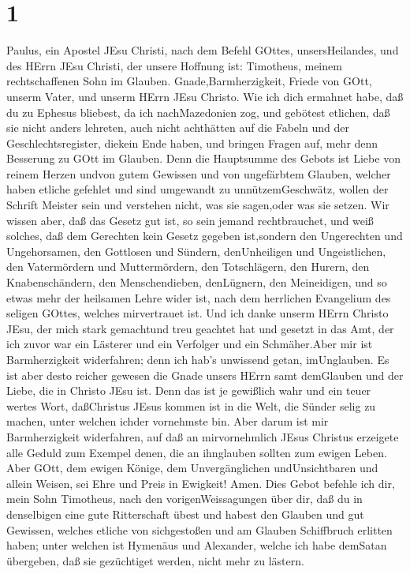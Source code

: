 \hypertarget{section}{%
\section{1}\label{section}}

 Paulus, ein Apostel JEsu Christi, nach dem Befehl GOttes,
unsersHeilandes, und des HErrn JEsu Christi, der unsere Hoffnung ist:
 Timotheus, meinem rechtschaffenen Sohn im Glauben.
Gnade,Barmherzigkeit, Friede von GOtt, unserm Vater, und unserm HErrn
JEsu Christo.  Wie ich dich ermahnet habe, daß du zu Ephesus
bliebest, da ich nachMazedonien zog, und gebötest etlichen, daß sie
nicht anders lehreten,  auch nicht achthätten auf die Fabeln
und der Geschlechtsregister, diekein Ende haben, und bringen Fragen auf,
mehr denn Besserung zu GOtt im Glauben.  Denn die Hauptsumme
des Gebots ist Liebe von reinem Herzen undvon gutem Gewissen und von
ungefärbtem Glauben,  welcher haben etliche gefehlet und
sind umgewandt zu unnützemGeschwätz,  wollen der Schrift
Meister sein und verstehen nicht, was sie sagen,oder was sie setzen.
 Wir wissen aber, daß das Gesetz gut ist, so sein jemand
rechtbrauchet,  und weiß solches, daß dem Gerechten kein
Gesetz gegeben ist,sondern den Ungerechten und Ungehorsamen, den
Gottlosen und Sündern, denUnheiligen und Ungeistlichen, den Vatermördern
und Muttermördern, den Totschlägern,  den Hurern, den
Knabenschändern, den Menschendieben, denLügnern, den Meineidigen, und so
etwas mehr der heilsamen Lehre wider ist,  nach dem
herrlichen Evangelium des seligen GOttes, welches mirvertrauet ist.
 Und ich danke unserm HErrn Christo JEsu, der mich stark
gemachtund treu geachtet hat und gesetzt in das Amt,  der
ich zuvor war ein Lästerer und ein Verfolger und ein Schmäher.Aber mir
ist Barmherzigkeit widerfahren; denn ich hab's unwissend getan,
imUnglauben.  Es ist aber desto reicher gewesen die Gnade
unsers HErrn samt demGlauben und der Liebe, die in Christo JEsu ist.
 Denn das ist je gewißlich wahr und ein teuer wertes Wort,
daßChristus JEsus kommen ist in die Welt, die Sünder selig zu machen,
unter welchen ichder vornehmste bin.  Aber darum ist mir
Barmherzigkeit widerfahren, auf daß an mirvornehmlich JEsus Christus
erzeigete alle Geduld zum Exempel denen, die an ihnglauben sollten zum
ewigen Leben.  Aber GOtt, dem ewigen Könige, dem
Unvergänglichen undUnsichtbaren und allein Weisen, sei Ehre und Preis in
Ewigkeit! Amen.  Dies Gebot befehle ich dir, mein Sohn
Timotheus, nach den vorigenWeissagungen über dir, daß du in denselbigen
eine gute Ritterschaft übest  und habest den Glauben und
gut Gewissen, welches etliche von sichgestoßen und am Glauben
Schiffbruch erlitten haben;  unter welchen ist Hymenäus und
Alexander, welche ich habe demSatan übergeben, daß sie gezüchtiget
werden, nicht mehr zu lästern.


